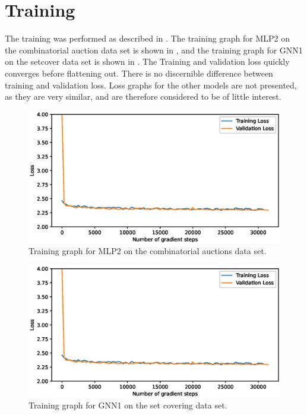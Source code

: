 \section{Training}\label{sec:res_training}

The training was performed as described in . 
The training graph for MLP2 on the combinatorial auction data set is shown in , and the training graph for GNN1 on the setcover data set is shown in . The Training and validation loss quickly converges before flattening out. There is no discernible difference between training and validation loss. Loss graphs for the other models are not presented, as they are very similar, and are therefore considered to be of little interest. 
%
\begin{figure}[h]
    \centering
    \includegraphics[width=\textwidth]{img/loss70.eps}
    \caption{Training graph for MLP2 on the combinatorial auctions data set.}
    \label{fig:training_mlp2}
\end{figure}

\begin{figure}[h]
    \centering
    \includegraphics[width=\textwidth]{img/loss70.eps}
    \caption{Training graph for GNN1 on the set covering data set.}
    \label{fig:training_gnn1}
\end{figure}



